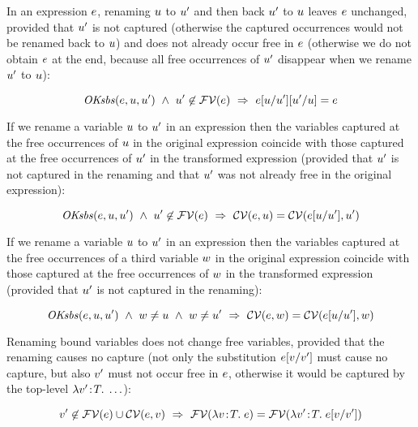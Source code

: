 In an expression $e$, renaming $u$ to $u'$ and then back $u'$
to $u$ leaves $e$ unchanged, provided that $u'$ is not captured
(otherwise the captured occurrences would not be renamed back to $u$) and
does not already occur free in $e$ (otherwise we do not obtain $e$ at
the end, because all free occurrences of $u'$ disappear when we rename
$u'$ to $u$):

\begin{theorem}\label{thm-esbs-inverse}
\[
\mathit{OKsbs}(e,u,u')\ \wedge\ 
u'\not\in\mathcal{FV}(e)\ \Rightarrow\ 
e[u/u'][u'/u]=e
\]
\end{theorem}

If we rename a variable $u$ to $u'$ in an expression then the
variables captured at the free occurrences of $u$ in the original
expression coincide with those captured at the free occurrences of $u'$ in
the transformed expression (provided that $u'$ is not captured in the
renaming and that $u'$ was not already free in the original expression):

\begin{theorem}\label{thm-capt-rename1}
\[
\mathit{OKsbs}(e,u,u')\ \wedge\ 
u'\not\in\mathcal{FV}(e)\ \Rightarrow\ 
\mathcal{CV}(e,u)=\mathcal{CV}(e[u/u'],u')
\]
\end{theorem}

If we rename a variable $u$ to $u'$ in an expression then the
variables captured at the free occurrences of a third variable $w$ in the
original expression coincide with those captured at the free occurrences of
$w$ in the transformed expression (provided that $u'$ is not captured
in the renaming):

\begin{theorem}\label{thm-capt-rename2}
\[
\mathit{OKsbs}(e,u,u')\ \wedge\ 
w\neq u\ \wedge\ 
w\neq u'\ \Rightarrow\ 
\mathcal{CV}(e,w)=\mathcal{CV}(e[u/u'],w)
\]
\end{theorem}

Renaming bound variables does not change free variables, provided that the
renaming causes no capture (not only the substitution
$e[v/v']$ must cause no capture, but also $v'$ must not
occur free in $e$, otherwise it would be captured by the top-level
$\lambda v'\!:\!T.\;\ldots$):

\begin{theorem}\label{thm-alpha-same-free-vars}
\[
v'\not\in\mathcal{FV}(e)\cup\mathcal{CV}(e,v)\ \Rightarrow\ 
\mathcal{FV}(\lambda v\!:\!T.\;e)=\mathcal{FV}(\lambda v'\!:\!T.\;e[v/v'])
\]
\end{theorem}

